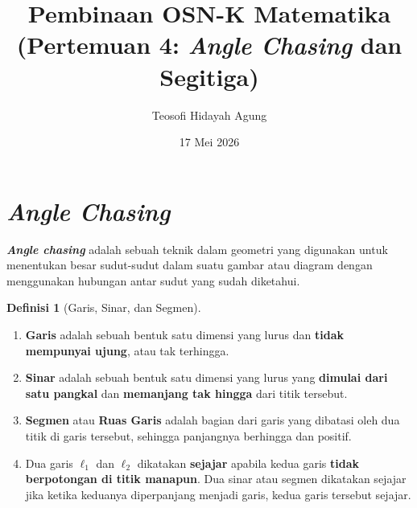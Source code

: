 ﻿\documentclass[aspectratio=169]{beamer}
\date{17 Mei 2026}
\title[OSK Matematika - Geometri]{Pembinaan OSN-K Matematika\\(Pertemuan 4: \textit{Angle Chasing} dan Segitiga)}
\author[Tetew]{Teosofi Hidayah Agung}
\institute[MAN 1 Pasuruan]{MAN 1 Pasuruan}
\theoremstyle{definition}
\newtheorem{definisi}{Definisi}
\begin{document}
\begin{frame}
  \titlepage
\end{frame}


\section{\textit{Angle Chasing}}
\begin{frame}{\insertsection}
  \textbf{\textit{Angle chasing}} adalah sebuah teknik dalam geometri yang digunakan untuk menentukan besar sudut-sudut dalam suatu gambar atau diagram dengan menggunakan hubungan antar sudut yang sudah diketahui.

  \begin{definisi}[Garis, Sinar, dan Segmen]
    \begin{enumerate}
      \item \textbf{Garis} adalah sebuah bentuk satu dimensi yang lurus dan \textbf{tidak mempunyai ujung}, atau tak terhingga.
      \item \textbf{Sinar} adalah sebuah bentuk satu dimensi yang lurus yang \textbf{dimulai dari satu pangkal} dan \textbf{memanjang tak hingga} dari titik tersebut.
      \item \textbf{Segmen} atau \textbf{Ruas Garis} adalah bagian dari garis yang dibatasi oleh dua titik di garis tersebut, sehingga panjangnya berhingga dan positif.
      \item Dua garis $\ell_1$ dan $\ell_2$ dikatakan \textbf{sejajar} apabila kedua garis \textbf{tidak berpotongan di titik manapun}. Dua sinar atau segmen dikatakan sejajar jika ketika keduanya diperpanjang menjadi garis, kedua garis tersebut sejajar.
    \end{enumerate}
  \end{definisi}
\end{frame}
\end{document}
